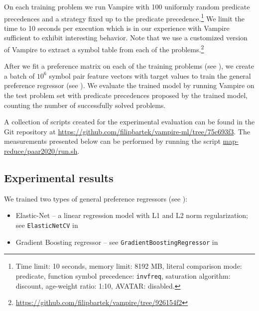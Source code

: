 \documentclass{ceurart}
\begin{document}
On each training problem we run %
Vampire with 100 uniformly random predicate precedences
and a strategy fixed up to the predicate precedence.\footnote{Time limit: 10 seconds, memory limit: 8192 MB, literal comparison mode: predicate, function symbol precedence: \texttt{invfreq}, saturation algorithm: discount, age-weight ratio: 1:10, AVATAR: disabled.}
We limit the time to 10 seconds per execution which is in our experience with Vampire sufficient to exhibit interesting behavior.
Note that we use a customized version of Vampire to extract a symbol table from each of the problems.\footnote{\url{https://github.com/filipbartek/vampire/tree/926154f2}}

After we fit a preference matrix on each of the training problems (see ),
we create a batch of \(10^6\) symbol pair feature vectors with target values
to train the general preference regressor (see ).
We evaluate the trained model by running Vampire on the test problem set with predicate precedences
proposed by the trained model,
counting the number of successfully solved problems.

A collection of scripts created for the experimental evaluation can be found in the Git repository at
\url{https://github.com/filipbartek/vampire-ml/tree/75c693f3}.
The measurements presented below can be performed by
running the script
\href{https://github.com/filipbartek/vampire-ml/blob/75c693f3/map-reduce/paar2020/run.sh}{map-reduce/paar2020/run.sh}.

\subsection{Experimental results}
\label{sect:experimental-results}

We trained two types of general preference regressors (see ):
\begin{itemize}
	\item Elastic-Net -- a linear regression model with L1 and L2 norm regularization; \\
	see \texttt{ElasticNetCV} in \citet{scikit-learn}
	\item Gradient Boosting regressor -- see \texttt{GradientBoostingRegressor} in \citet{scikit-learn}
\end{itemize}
\end{document}
